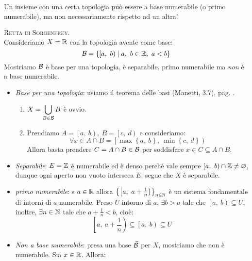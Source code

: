 \begin{attention}
Un insieme con una certa topologia può essere a base numerabile (o primo numerabile), ma non necessariamente rispetto ad un altra!
\end{attention}
\begin{example}
\textsc{Retta di Sorgenfrey}.\\
Consideriamo $X=\mathbb{R}$ con la topologia avente come base:
\begin{equation}
\basis=\left\{\left[a,\ b\right)\mid a,\ b\in\realset,\ a<b\right\}
\end{equation}
Mostriamo $\mathcal{B}$ è base per una topologia, è separabile, primo numerabile ma \textit{non} è a base numerabile.
\begin{itemize}
	\item \textit{Base per una topologia}: usiamo il teorema delle basi (Manetti, 3.7), pag. \pageref{teoremabasi}.
	\begin{enumerate}[label=\Roman*]
		\item $\displaystyle X=\mathop{{\bigcup}}\displaylimits_{B\in \mathcal{B}}B$ è ovvio.
		\item Prendiamo $A=\left[a,\ b\right),\ B=\left[c,\ d\right)$ e consideriamo:
		\begin{equation*}
			\forall x\in A\cap B=\left[\max\left\{a,\ b\right\},\ \min\left\{c,\ d\right\}\right)
		\end{equation*}
	Allora basta prendere $C=A\cap B\in\mathcal{B}$ per soddisfare $x\in C\subseteq A\cap B$.
	\end{enumerate}
\item \textit{Separabile}: $E=\mathbb{Z}$ è numerabile ed è denso perché vale sempre $\left[a,\ b\right)\cap \mathbb{Z} \neq \varnothing$, dunque ogni aperto non vuoto interseca $E$; segue che $X$ è separabile.
\item \textit{primo numerabile}: s $a\in\mathbb{R}$ allora $\left\{\left[a,\ a+\frac{1}{n}\right)\right\}_{n\in\naturalset}$ è un sistema fondamentale di intorni di $a$ numerabile. Preso $U$ intorno di $a$, $\exists b>a$ tale che $\left[a,\ b\right)\subseteq U$; inoltre, $\exists n\in\mathbb{N}$ tale che $a+\frac{1}{n}<b$, cioè:
\begin{equation*}
\left[a,\ a+\frac{1}{n}\right)\subseteq\left[a,\ b\right)\subseteq U
\end{equation*}
\item \textit{Non a base numerabile}: presa una base $\widetilde{\mathcal{B}}$ per $X$, mostriamo che non è numerabile. Sia $x\in\mathbb{R}$. Allora:
\begin{equation*}

\end{equation*}
\end{itemize}
\end{example}
